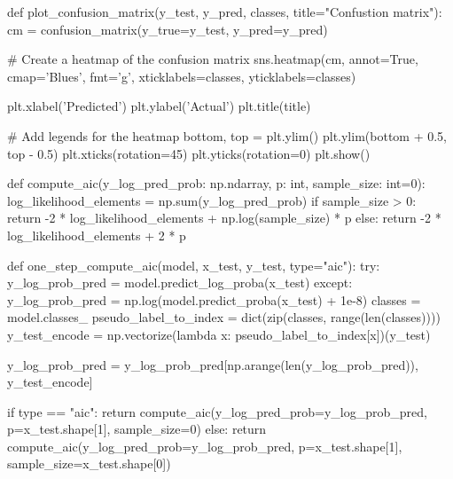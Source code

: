 \begin{python}
        
def plot_confusion_matrix(y_test, y_pred, classes, title="Confustion matrix"):
    cm = confusion_matrix(y_true=y_test, y_pred=y_pred)

    # Create a heatmap of the confusion matrix
    sns.heatmap(cm, annot=True, cmap='Blues', fmt='g', xticklabels=classes, yticklabels=classes)

    plt.xlabel('Predicted')
    plt.ylabel('Actual')
    plt.title(title)

    # Add legends for the heatmap
    bottom, top = plt.ylim()
    plt.ylim(bottom + 0.5, top - 0.5)
    plt.xticks(rotation=45)
    plt.yticks(rotation=0)
    plt.show()
    
    
def compute_aic(y_log_pred_prob: np.ndarray, p: int, sample_size: int=0):
    log_likelihood_elements = np.sum(y_log_pred_prob)
    if sample_size > 0:
        return -2 * log_likelihood_elements + np.log(sample_size) * p
    else:
        return -2 * log_likelihood_elements + 2 * p
    
    
def one_step_compute_aic(model, x_test, y_test, type="aic"):
    try:
        y_log_prob_pred = model.predict_log_proba(x_test)
    except:
        y_log_prob_pred = np.log(model.predict_proba(x_test) + 1e-8)
    classes = model.classes_
    pseudo_label_to_index = dict(zip(classes, range(len(classes))))
    y_test_encode = np.vectorize(lambda x: pseudo_label_to_index[x])(y_test)
    
    y_log_prob_pred = y_log_prob_pred[np.arange(len(y_log_prob_pred)), y_test_encode]
    
    if type == "aic":
        return compute_aic(y_log_pred_prob=y_log_prob_pred, p=x_test.shape[1], sample_size=0)
    else:
        return compute_aic(y_log_pred_prob=y_log_prob_pred, p=x_test.shape[1], sample_size=x_test.shape[0])
\end{python}